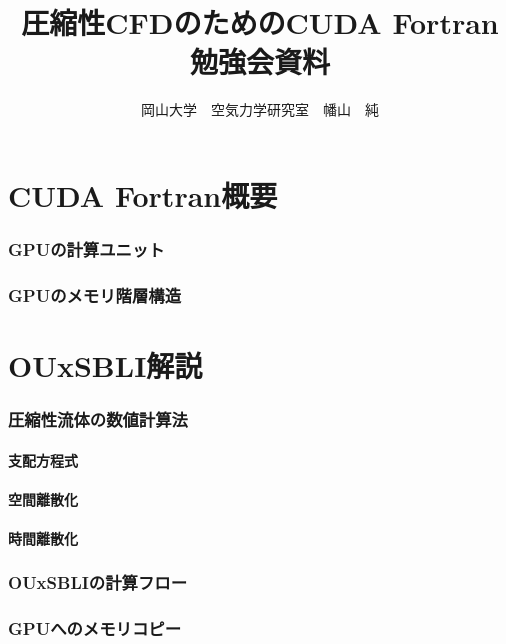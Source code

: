 \documentclass{ltjsarticle}
\begin{document}
\title{圧縮性CFDのためのCUDA Fortran勉強会資料}
\author{岡山大学　空気力学研究室　幡山　純}
\maketitle
\clearpage

\tableofcontents
\clearpage

\part{CUDA Fortran概要}
\section{GPUの計算ユニット}


\section{GPUのメモリ階層構造}


\clearpage

\part{OUxSBLI解説}
\section{圧縮性流体の数値計算法}
\subsection{支配方程式}


\subsection{空間離散化}


\subsection{時間離散化}


\section{OUxSBLIの計算フロー}


\section{GPUへのメモリコピー}

\end{document}
